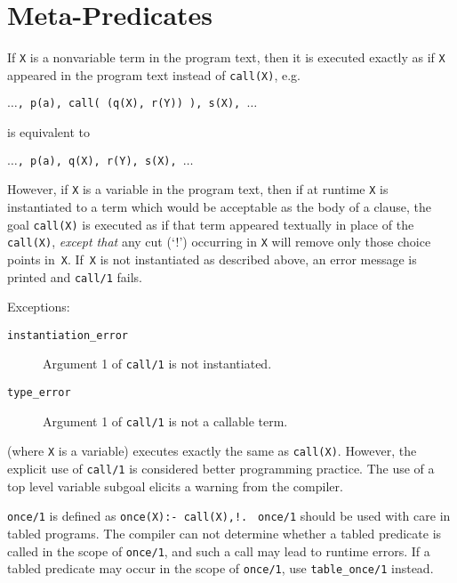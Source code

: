 \section{Meta-Predicates} \label{meta_predicates}
\begin{description}
    If {\tt X} is a nonvariable term in the program text, then it is 
    executed exactly as if {\tt X} appeared in the program text instead 
    of {\tt call(X)},
    e.g.
    \begin{center}
        {\tt $\ldots$, p(a), call( (q(X), r(Y)) ), s(X), $\ldots$}
    \end{center}
    is equivalent to
    \begin{center}
        {\tt $\ldots$, p(a), q(X), r(Y), s(X), $\ldots$}
    \end{center}
    However, if {\tt X} is a variable in the program text,
    then if at runtime {\tt X} is instantiated to a term which 
    would be acceptable as the body of a clause, the goal 
    {\tt call(X)} is executed as if that
    term appeared textually in place of the {\tt call(X)},
    {\em except that} any cut (`!')
    occurring in {\tt X} will remove only those choice points in~{\tt X}.
    If~{\tt X} is not instantiated as described above,
    an error message is printed and {\tt call/1} fails.

    Exceptions:
    \begin{description}
    \item[{\tt instantiation\_error}]
	Argument 1 of {\tt call/1} is not instantiated.
     \item[{\tt type\_error}]
	Argument 1 of {\tt call/1} is not a callable term.
    \end{description}

    (where {\tt X} is a variable) executes exactly the same as 
    {\tt call(X)}.
    However, the explicit use of {\tt call/1} is considered better
    programming practice.  The use of a top level variable subgoal
    elicits a warning from the compiler.

    {\tt once/1} is defined as {\tt once(X):- call(X),!.}  {\tt
    once/1} should be used with care in tabled programs.  The compiler
    can not determine whether a tabled predicate is called in the
    scope of {\tt once/1}, and such a call may lead to runtime errors.
    If a tabled predicate may occur in the scope of {\tt once/1}, use
    {\tt table\_once/1} instead.


\end{description}
